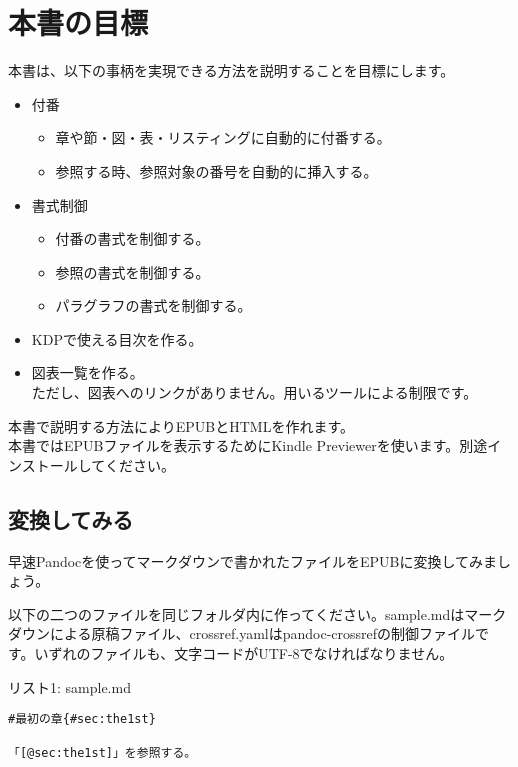 \chapter{本書の目標}\label{ux672cux66f8ux306eux76eeux6a19}

本書は、以下の事柄を実現できる方法を説明することを目標にします。

\begin{itemize}
\tightlist
\item
  付番

  \begin{itemize}
  \tightlist
  \item
    章や節・図・表・リスティングに自動的に付番する。
  \item
    参照する時、参照対象の番号を自動的に挿入する。
  \end{itemize}
\item
  書式制御

  \begin{itemize}
  \tightlist
  \item
    付番の書式を制御する。
  \item
    参照の書式を制御する。
  \item
    パラグラフの書式を制御する。
  \end{itemize}
\item
  KDPで使える目次を作る。
\item
  図表一覧を作る。\\
  ただし、図表へのリンクがありません。用いるツールによる制限です。
\end{itemize}

本書で説明する方法によりEPUBとHTMLを作れます。\\
本書ではEPUBファイルを表示するためにKindle
Previewerを使います。別途インストールしてください。

\section{変換してみる}\label{ux5909ux63dbux3057ux3066ux307fux308b}

早速Pandocを使ってマークダウンで書かれたファイルをEPUBに変換してみましょう。

以下の二つのファイルを同じフォルダ内に作ってください。sample.mdはマークダウンによる原稿ファイル、crossref.yamlはpandoc-crossrefの制御ファイルです。いずれのファイルも、文字コードがUTF-8でなければなりません。

リスト1: sample.md

\begin{verbatim}
#最初の章{#sec:the1st}

「[@sec:the1st]」を参照する。
\end{verbatim}

